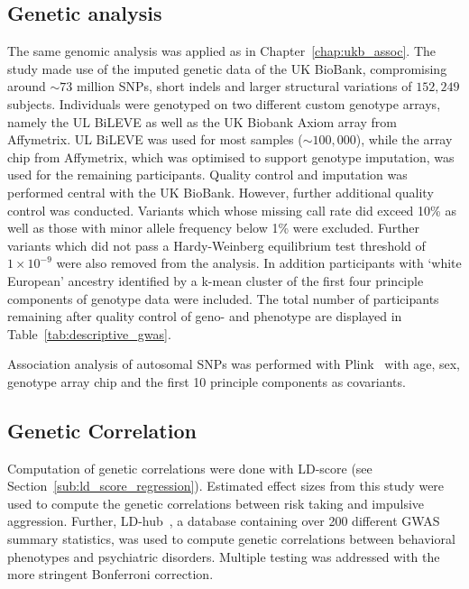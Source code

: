 \subsection{Genetic analysis}
\label{sub:genetic_analysis}

The same genomic analysis was applied as in Chapter~\ref{chap:ukb_assoc}.
The study made use of the imputed genetic data of the UK BioBank, compromising around $\sim73$ million SNPs, short indels and larger structural variations of $152,249$ subjects.
Individuals were genotyped on two different custom genotype arrays, namely the UL BiLEVE as well as the UK Biobank Axiom array from Affymetrix. 
UL BiLEVE was used for most samples ($\sim100,000$), while the array chip from Affymetrix, which was optimised to support genotype imputation, was used for the remaining participants. 
Quality control and imputation was performed central with the UK BioBank.
However, further additional quality control was conducted.
Variants which whose missing call rate did exceed 10\% as well as those with minor allele frequency below 1\% were excluded.
Further variants which did not pass a Hardy-Weinberg equilibrium test threshold of $1\times10^{-9}$ were also removed from the analysis.
In addition participants with `white European' ancestry identified by a k-mean cluster of the first four principle components of genotype data were included.
The total number of participants remaining after quality control of geno- and phenotype are displayed in Table~\ref{tab:descriptive_gwas}.

Association analysis of autosomal SNPs was performed with Plink~\cite{Purcell2007,Chang2015} with age, sex, genotype array chip and the first 10 principle components as covariants.

\subsection{Genetic Correlation}
\label{sub:genetic_correlation}

Computation of genetic correlations were done with LD-score (see Section~\ref{sub:ld_score_regression}).
Estimated effect sizes from this study were used to compute the genetic correlations between risk taking and impulsive aggression.
Further, LD-hub~\cite{ZHENG2016}, a database containing over 200 different GWAS summary statistics, was used to compute genetic correlations between behavioral phenotypes and psychiatric disorders.
Multiple testing was addressed with the more stringent Bonferroni correction.

